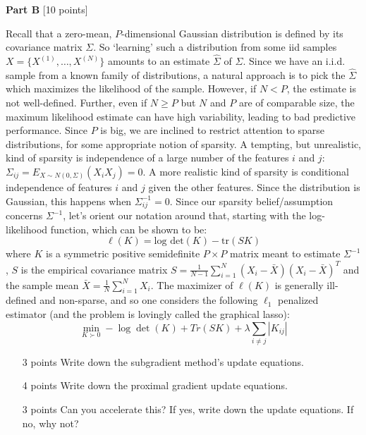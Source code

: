 {\bf Part B} [10 points] 

Recall that a zero-mean, $P$-dimensional Gaussian distribution is defined by its covariance matrix $\Sigma$. So `learning' such a distribution from some iid samples $X = \{ X^{(1)},\ldots, X^{(N)} \}$ amounts to an estimate $\widehat{\Sigma}$ of $\Sigma$. Since we have an i.i.d. sample from a known family of distributions, a natural approach is to pick the $\widehat{\Sigma}$ which maximizes the likelihood of the sample. However, if $N < P$, the estimate is not well-defined. Further, even if $N \geq P$ but $N$ and $P$ are of comparable size, the maximum likelihood estimate can have high variability, leading to bad predictive performance. Since $P$ is big, we are inclined to restrict attention to sparse distributions, for some appropriate notion of sparsity. A tempting, but unrealistic, kind of sparsity is independence of a large number of the features $i$ and $j$: $\Sigma_{ij} = E_{X \sim N(0,\Sigma)}(X_i X_j) = 0$. A more realistic kind of sparsity is conditional independence of features $i$ and $j$ given the other features. Since the distribution is Gaussian, this happens when $\Sigma^{-1}_{ij} = 0$. Since our sparsity belief/assumption concerns $\Sigma^{-1}$, let's orient our notation around that, starting with the log-likelihood function, which can be shown to be:
$$\ell(K) = \textrm{log det}(K) - \textrm{tr}(SK)$$
where $K$ is a symmetric positive semidefinite $P \times P$ matrix meant to estimate $\Sigma^{-1}$, $S$ is the empirical covariance matrix $S = \frac{1}{N-1} \sum_{i=1}^{N}(X_i - \bar{X})(X_i - \bar{X})^T$ and the sample mean $\bar{X} = \frac{1}{N}\sum_{i=1}^N X_i$.
The maximizer of $\ell(K)$ is generally ill-defined and non-sparse, and so one considers the following $\ell_1$ penalized estimator (and the problem is lovingly called the graphical lasso):
$$
\min_{K \succ 0} -\log \det (K) + Tr(SK) + \lambda \sum_{i \neq j} |K_{ij}|
$$

\begin{enumerate}
\item [3 points] Write down the subgradient method's update equations.

\item [4 points] Write down the proximal gradient update equations.

\item [3 points] Can you accelerate this? If yes, write down the update equations. If no, why not?
\end{enumerate}
